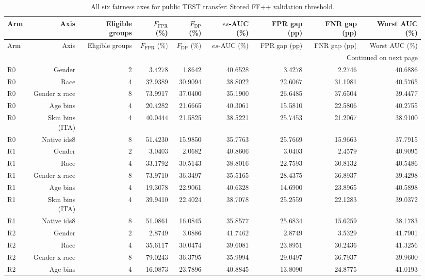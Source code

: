 \documentclass[10pt]{article}
\begin{document}
\begin{longtable}{@{}lrrrrrrrr@{}}
\caption{All six fairness axes for public TEST transfer: Stored FF++ validation threshold.}\\
\toprule
Arm & Axis & Eligible groups & $F_{\mathrm{FPR}}$ (\%) & $F_{\mathrm{DP}}$ (\%) & $es$-AUC (\%) & FPR gap (pp) & FNR gap (pp) & Worst AUC (\%) \\
\midrule
\endfirsthead
\toprule
Arm & Axis & Eligible groups & $F_{\mathrm{FPR}}$ (\%) & $F_{\mathrm{DP}}$ (\%) & $es$-AUC (\%) & FPR gap (pp) & FNR gap (pp) & Worst AUC (\%) \\
\midrule
\endhead
\midrule
\multicolumn{9}{r}{Continued on next page}\\
\endfoot
\bottomrule
\endlastfoot
R0 & Gender & 2 & 3.4278 & 1.8642 & 40.6528 & 3.4278 & 2.2746 & 40.6886 \\
R0 & Race & 4 & 32.9389 & 30.9094 & 38.8022 & 22.6067 & 31.1981 & 40.5765 \\
R0 & Gender x race & 8 & 73.9917 & 37.0400 & 35.1900 & 26.6485 & 37.6504 & 39.4477 \\
R0 & Age bins & 4 & 20.4282 & 21.6665 & 40.3061 & 15.5810 & 22.5806 & 40.2755 \\
R0 & Skin bins (ITA) & 4 & 40.0444 & 21.5825 & 38.5221 & 25.7453 & 21.2067 & 38.9100 \\
R0 & Native ids8 & 8 & 51.4230 & 15.9850 & 35.7763 & 25.7669 & 15.9663 & 37.7915 \\
R1 & Gender & 2 & 3.0403 & 2.0682 & 40.8606 & 3.0403 & 2.4579 & 40.9095 \\
R1 & Race & 4 & 33.1792 & 30.5143 & 38.8016 & 22.7593 & 30.8132 & 40.5486 \\
R1 & Gender x race & 8 & 73.9710 & 36.3497 & 35.5165 & 28.4375 & 36.8937 & 39.4298 \\
R1 & Age bins & 4 & 19.3078 & 22.9061 & 40.6328 & 14.6900 & 23.8965 & 40.5898 \\
R1 & Skin bins (ITA) & 4 & 39.9410 & 22.4024 & 38.7078 & 25.2559 & 22.1283 & 39.0372 \\
R1 & Native ids8 & 8 & 51.0861 & 16.0845 & 35.8577 & 25.6834 & 15.6259 & 38.1783 \\
R2 & Gender & 2 & 2.8749 & 3.0886 & 41.7462 & 2.8749 & 3.5329 & 41.7901 \\
R2 & Race & 4 & 35.6117 & 30.0474 & 39.6081 & 23.8951 & 30.2436 & 41.3256 \\
R2 & Gender x race & 8 & 79.0243 & 36.3795 & 35.9994 & 29.0497 & 36.7937 & 39.9600 \\
R2 & Age bins & 4 & 16.0873 & 23.7896 & 40.8845 & 13.8090 & 24.8775 & 41.0193 \\

\end{longtable}
\end{document}

